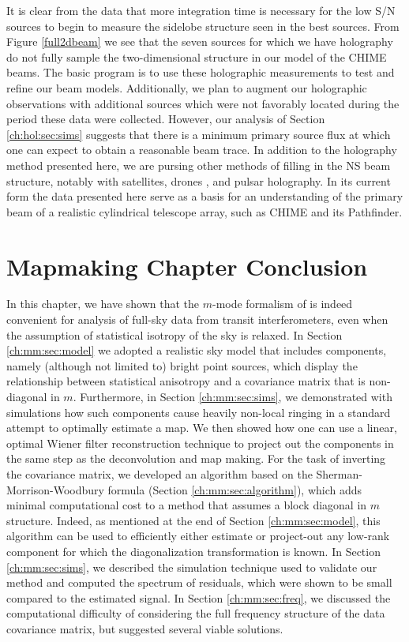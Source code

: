 It is clear from the data that more integration time is necessary for the low S/N sources to begin to measure the sidelobe structure seen in the best sources. From Figure \ref{full2dbeam} we see that the seven sources for which we have holography do not fully sample the two-dimensional structure in our model of the CHIME beams. The basic program is to use these holographic measurements to test and refine our beam models. Additionally, we plan to augment our holographic observations with additional sources which were not favorably located during the period these data were collected. However, our analysis of Section \ref{ch:hol:sec:sims} suggests that there is a minimum primary source flux at which one can expect to obtain a reasonable beam trace. In addition to the holography method presented here, we are pursing other methods of filling in the NS beam structure, notably with satellites\citep{hol2, sat2}, drones \citep{drone}, and pulsar holography. In its current form the data presented here serve as a basis for an understanding of the primary beam of a realistic cylindrical telescope array, such as CHIME and its Pathfinder.

\section{Mapmaking Chapter Conclusion}
\label{ch:conclusion:sec:mmodes}

In this chapter, we have shown that the $m$-mode formalism of \cite{mmodes1, mmodes2} is indeed convenient for analysis of full-sky data from transit interferometers, even when the assumption of statistical isotropy of the sky is relaxed. In Section \ref{ch:mm:sec:model} we adopted a realistic sky model that includes components, namely (although not limited to) bright point sources, which display the relationship between statistical anisotropy and a covariance matrix that is non-diagonal in $m$. Furthermore, in Section \ref{ch:mm:sec:sims}, we demonstrated with simulations how such components cause heavily non-local ringing in a standard attempt to optimally estimate a map. We then showed how one can use a linear, optimal Wiener filter reconstruction technique to project out the components in the same step as the deconvolution and map making. For the task of inverting the covariance matrix, we developed an algorithm based on the Sherman-Morrison-Woodbury formula (Section \ref{ch:mm:sec:algorithm}), which adds minimal computational cost to a method that assumes a block diagonal in $m$ structure. Indeed, as mentioned at the end of Section \ref{ch:mm:sec:model}, this algorithm can be used to efficiently either estimate or project-out any low-rank component for which the diagonalization transformation is known. In Section \ref{ch:mm:sec:sims}, we described the simulation technique used to validate our method and computed the spectrum of residuals, which were shown to be small compared to the estimated signal. In Section \ref{ch:mm:sec:freq}, we discussed the computational difficulty of considering the full frequency structure of the data covariance matrix, but suggested several viable solutions.

